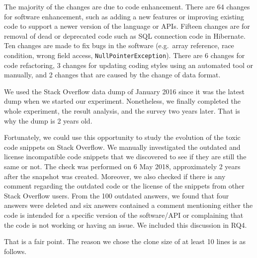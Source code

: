 \documentclass[a4paper,twoside,10pt]{reviewresponse}
\begin{document}
The majority of the changes are due to code enhancement. There are 64 changes for software enhancement, such as adding a new features or improving existing code to support a newer version of the language or APIs. Fifteen changes are for removal of dead or deprecated code such as SQL connection code in Hibernate. Ten changes are made to fix bugs in the software (e.g.~array reference, race condition, wrong field access, \texttt{NullPointerException}). There are 6 changes for code refactoring, 3 changes for updating coding styles using an automated tool or manually, and 2 changes that are caused by the change of data format.


We used the Stack Overflow data dump of January 2016 since it was the latest dump when we started our experiment. Nonetheless, we finally completed the whole experiment, the result analysis, and the survey two years later. That is why the dump is 2 years old.

Fortunately, we could use this opportunity to study the evolution of the toxic code snippets on Stack Overflow. We manually investigated the outdated and license incompatible code snippets that we discovered to see if they are still the same or not. The check was performed on 6 May 2018, approximately 2 years after the snapshot was created. Moreover, we also checked if there is any comment regarding the outdated code or the license of the snippets from other Stack Overflow users. From the 100 outdated answers, we found that four answers were deleted and six answers contained a comment mentioning either the code is intended for a specific version of the software/API or complaining that the code is not working or having an issue. 
We included this discussion in RQ4.


That is a fair point. The reason we chose the clone size of at least 10 lines is as follows. 
\end{document}
